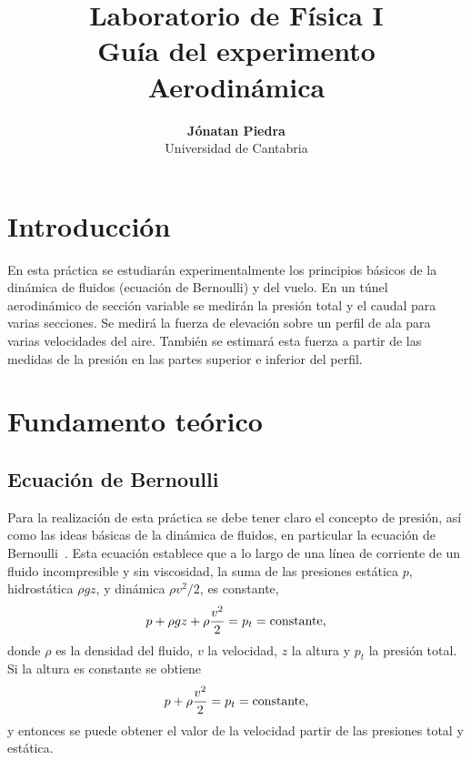 \documentclass[11pt]{articulo}
\begin{document}
\title{\bf Laboratorio de F\'isica I\\
  Gu\'ia del experimento Aerodin\'amica} 
\author{
  {\bf J\'onatan Piedra}\\
  Universidad de Cantabria}
\maketitle


\section{Introducci\'on}

En esta pr\'actica se estudiar\'an experimentalmente los principios b\'asicos de la din\'amica de fluidos (ecuaci\'on de Bernoulli) y del vuelo. En un t\'unel aerodin\'amico de secci\'on variable se medir\'an la presi\'on total y el caudal para varias secciones. Se medir\'a la fuerza de elevaci\'on sobre un perfil de ala para varias velocidades del aire. Tambi\'en se estimar\'a esta fuerza a partir de las medidas de la presi\'on en las partes superior e inferior del perfil.


\section{Fundamento te\'orico}

\subsection{Ecuaci\'on de Bernoulli}

Para la realizaci\'on de esta pr\'actica se debe tener claro el concepto de presi\'on, as\'i como las ideas b\'asicas de la din\'amica de fluidos, en particular la ecuaci\'on de Bernoulli~\cite{tipler}. Esta ecuaci\'on establece que a lo largo de una l\'inea de corriente de un fluido incompresible y sin viscosidad, la suma de las presiones est\'atica $p$, hidrost\'atica $\rho g z$, y din\'amica $\rho v^2/2$, es constante,
%
\begin{equation*}
p + \rho g z + \rho \frac{v^2}{2} = p_t = {\rm constante},
\end{equation*}
%
donde $\rho$ es la densidad del fluido, $v$ la velocidad, $z$ la altura y $p_t$ la presi\'on total. Si la altura es constante se obtiene
%
\begin{equation*}
p + \rho \frac{v^2}{2} = p_t = {\rm constante},
\end{equation*}
%
y entonces se puede obtener el valor de la velocidad partir de las presiones total y est\'atica.
\end{document}
